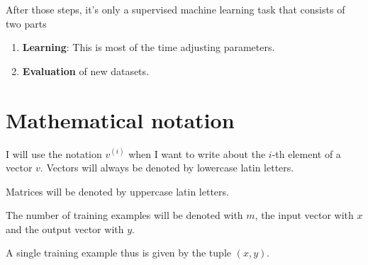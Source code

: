 After those steps, it's only a supervised machine learning task that consists of
two parts

\begin{enumerate}
    \item \textbf{Learning}: This is most of the time adjusting parameters.
    \item \textbf{Evaluation} of new datasets.
\end{enumerate}

\section{Mathematical notation}
I will use the notation $v^{(i)}$ when I want to write about the $i$-th element
of a vector $v$. Vectors will always be denoted by lowercase latin letters.

Matrices will be denoted by uppercase latin letters.

The number of training examples will be denoted with $m$, the input vector with
$x$ and the output vector with $y$.

A single training example thus is given by the tuple $(x, y)$.